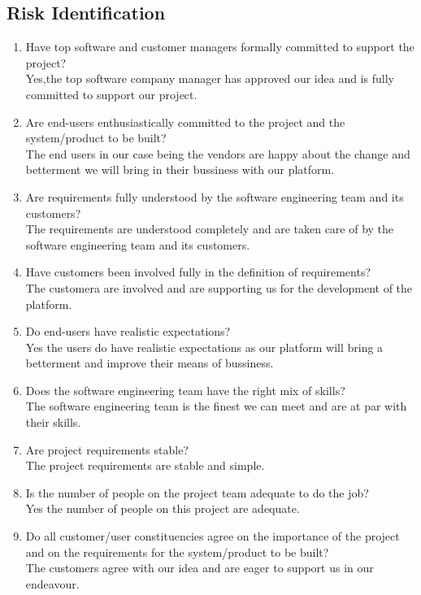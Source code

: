 \documentclass[oneside,a4paper,12pt]{report}
\begin{document}
\subsection{Risk Identification}
\begin{enumerate}
\item Have top software and customer managers formally committed to support the project?\\
Yes,the top software company manager has approved our idea and is fully committed to support our project.
\item Are end-users enthusiastically committed to the project and the system/product to be built?\\
The end users in our case being the vendors are happy about the change and betterment we will bring in their bussiness with our platform.
\item Are requirements fully understood by the software engineering team and its customers?\\
The requirements are understood completely and are taken care of by the software engineering team and its customers.
\item Have customers been involved fully in the definition of requirements?\\
The customera are involved and are supporting us for the development of the platform.
\item Do end-users have realistic expectations?\\
 Yes the users do have realistic expectations as our platform will bring a betterment and improve their means of bussiness.
\item Does the software engineering team have the right mix of skills?\\
The software engineering team is the finest we can meet and are at par with their skills.
\item Are project requirements stable?\\
 The project requirements are stable and simple.
\item Is the number of people on the project team adequate to do the job?\\
Yes the number of people on this project are adequate.
\item Do all customer/user constituencies agree on the importance of the project and on the requirements for the system/product to be built?\\
 The customers agree with our idea and are eager to support us in our endeavour.
\end{enumerate}
\end{document}
